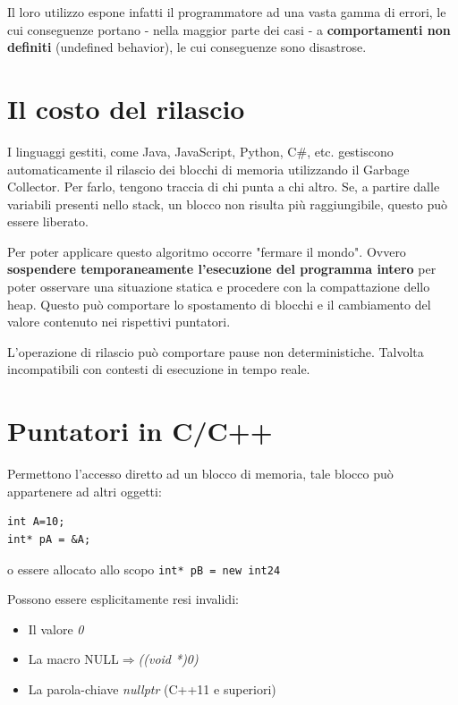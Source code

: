 Il loro utilizzo espone infatti il programmatore ad una vasta gamma di errori, le cui conseguenze portano - nella maggior parte dei casi - a \textbf{comportamenti non definiti} (undefined behavior), le cui conseguenze sono disastrose.

\section{Il costo del rilascio}

I linguaggi gestiti, come Java, JavaScript, Python, C\#, etc.  gestiscono automaticamente il rilascio dei blocchi di memoria utilizzando il Garbage Collector. Per farlo, tengono traccia di chi punta a chi altro. Se, a partire dalle variabili presenti nello stack, un blocco non risulta più raggiungibile, questo può essere liberato. \newline

Per poter applicare questo algoritmo occorre "fermare il mondo". Ovvero \textbf{sospendere temporaneamente l'esecuzione del programma intero} per poter osservare una situazione statica e procedere con la compattazione dello heap. Questo può comportare lo spostamento di blocchi e il cambiamento del valore contenuto nei rispettivi puntatori.

L'operazione di rilascio può comportare pause non deterministiche. Talvolta incompatibili con contesti di esecuzione in tempo reale.

\section{Puntatori in C/C++}

Permettono l'accesso diretto ad un blocco di memoria, tale blocco può appartenere ad altri oggetti:

\begin{verbatim}
int A=10;
int* pA = &A;    
\end{verbatim}

o essere allocato allo scopo \texttt{int* pB = new int{24}}

Possono essere esplicitamente resi invalidi:

\begin{itemize}
  \item Il valore \textit{0}
  \item La macro NULL$ \Rightarrow$\textit{((void *)0)}
  \item La parola-chiave \textit{nullptr}  (C++11 e superiori)
\end{itemize}

